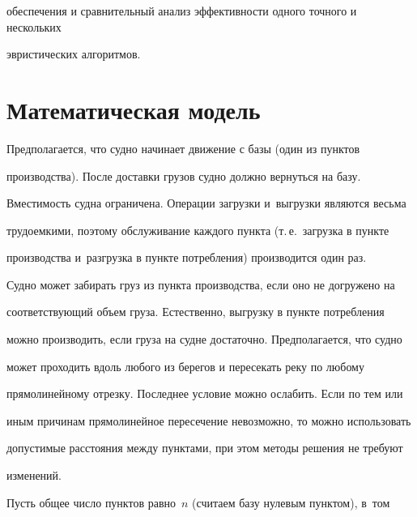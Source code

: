 обеспечения и сравнительный анализ эффективности одного точного и нескольких 


эвристических алгоритмов.





                  \vspace*{-6pt}





\section{Математическая модель}





\vspace*{-4pt}





  Предполагается, что судно начинает движение с базы (один из пунктов 


производства). После доставки грузов судно должно вернуться на базу. 


Вместимость судна ограничена. Операции загрузки и~выгрузки являются весьма 


трудоемкими, поэтому обслуживание каждого пункта (т.\,е.\ загрузка в пункте 


производства и~разгрузка в пункте потребления) производится один раз. 


  


  Судно может забирать груз из пункта производства, если оно не догружено на 


соответствующий объем груза. Естественно, выгрузку в пункте потребления 


можно производить, если груза на судне достаточно. Предполагается, что судно 


может проходить вдоль любого из берегов и пересекать реку по любому 


прямолинейному отрезку. Последнее условие можно ослабить. Если по тем или 


иным причинам прямолинейное пересечение невозможно, то можно использовать 


допустимые расстояния между пунктами, при этом методы решения не требуют 


изменений.


  


  Пусть общее число пунктов равно~$n$ (считаем базу нулевым пунктом), в~том 


